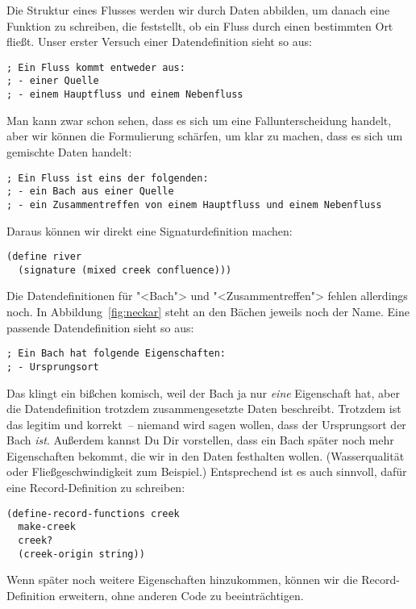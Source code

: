Die Struktur eines Flusses werden wir durch Daten abbilden, um danach
eine Funktion zu schreiben, die feststellt, ob ein Fluss durch einen
bestimmten Ort fließt.  Unser erster Versuch einer Datendefinition
sieht so aus:
%
\begin{lstlisting}
; Ein Fluss kommt entweder aus:
; - einer Quelle
; - einem Hauptfluss und einem Nebenfluss
\end{lstlisting}
%
Man kann zwar schon sehen, dass es sich um eine Fallunterscheidung
handelt, aber wir können die Formulierung schärfen, um klar zu machen,
dass es sich um gemischte Daten handelt:
%
\begin{lstlisting}
; Ein Fluss ist eins der folgenden:
; - ein Bach aus einer Quelle
; - ein Zusammentreffen von einem Hauptfluss und einem Nebenfluss
\end{lstlisting}
%
Daraus können wir direkt eine Signaturdefinition machen:
%
\begin{lstlisting}
(define river
  (signature (mixed creek confluence)))
\end{lstlisting}
%
Die Datendefinitionen für "<Bach"> und "<Zusammentreffen"> fehlen
allerdings noch.  In Abbildung~\ref{fig:neckar} steht an den Bächen
jeweils noch der Name.  Eine passende Datendefinition sieht so aus:
%
\begin{lstlisting}
; Ein Bach hat folgende Eigenschaften:
; - Ursprungsort
\end{lstlisting}
%
Das klingt ein bißchen komisch, weil der Bach ja nur \emph{eine}
Eigenschaft hat, aber die Datendefinition trotzdem zusammengesetzte
Daten beschreibt.  Trotzdem ist das legitim und korrekt~-- niemand
wird sagen wollen, dass der Ursprungsort der Bach \emph{ist}.
Außerdem kannst Du Dir vorstellen, dass ein Bach später noch mehr
Eigenschaften bekommt, die wir in den Daten festhalten
wollen. (Wasserqualität oder Fließgeschwindigkeit zum Beispiel.)
Entsprechend ist es auch sinnvoll, dafür eine Record-Definition zu
schreiben:
%
\begin{lstlisting}
(define-record-functions creek
  make-creek
  creek?
  (creek-origin string))
\end{lstlisting}
%
Wenn später noch weitere Eigenschaften hinzukommen, können wir die
Record-Definition erweitern, ohne anderen Code zu beeinträchtigen.

